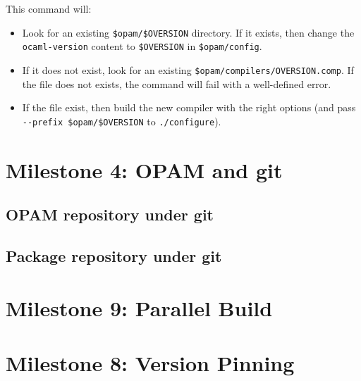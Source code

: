 \documentclass[a4paper,11pt]{article}
\begin{document}
This command will:

\begin{itemize}
\item Look for an existing \verb+$opam/$OVERSION+ directory. If it
  exists, then change the {\tt ocaml-version} content to
  \verb+$OVERSION+ in  \verb+$opam/config+.

\item If it does not exist, look for an existing
  \verb+$opam/compilers/OVERSION.comp+. If the file does not exists,
  the command will fail with a well-defined error.

\item If the file exist, then build the new compiler with the right
  options (and pass \verb+--prefix $opam/$OVERSION+ to
  \verb+./configure+).

\end{itemize}

\section{Milestone 4: OPAM and git}

\subsection{OPAM repository under git}

\subsection{Package repository under git}


\section{Milestone 9: Parallel Build}

\section{Milestone 8: Version Pinning}
\end{document}

